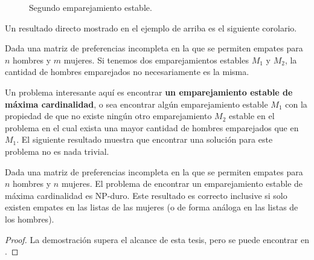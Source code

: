 \begin{eje}{\cite{empates}}
\begin{figure}[H]

\caption{Segundo emparejamiento estable.}
\end{figure}
\end{eje}

Un resultado directo mostrado en el ejemplo de arriba es el siguiente corolario.

\begin{cor}
Dada una matriz de preferencias incompleta en la que se permiten empates para $n$ hombres y $m$ mujeres. Si tenemos dos emparejamientos estables $M_1$ y $M_2$, la cantidad de hombres emparejados no necesariamente es la misma.
\end{cor}

Un problema interesante aquí es encontrar \textbf{un emparejamiento estable de máxima cardinalidad}, o sea encontrar algún emparejamiento estable $M_1$ con la propiedad de que no existe ningún otro emparejamiento $M_2$ estable en el problema en el cual exista una mayor cantidad de hombres emparejados que en $M_1$. El siguiente resultado muestra que encontrar una solución para este problema no es nada trivial.

\begin{teo} {\cite{empates}} \label{NPempates}
Dada una matriz de preferencias incompleta en la que se permiten empates para $n$ hombres y $n$ mujeres. El problema de encontrar un emparejamiento estable de máxima cardinalidad es NP-duro. Este resultado es correcto inclusive si solo existen empates en las listas de las mujeres (o de forma análoga en las listas de los hombres). 
\end{teo}
\begin{proof}
La demostración supera el alcance de esta tesis, pero se puede encontrar en \cite{empates}. 
\end{proof}















